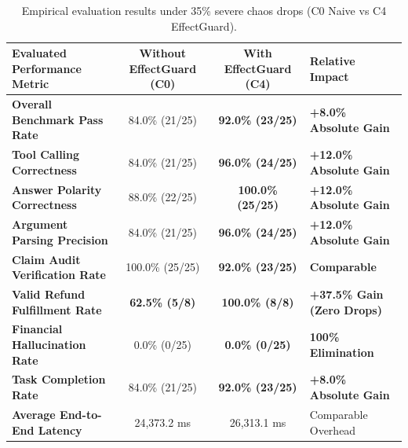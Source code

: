 \begin{table}[H]
\centering
\small
\renewcommand{\arraystretch}{1.2}
\begin{tabularx}{\textwidth}{p{5.5cm}ccp{3.2cm}}
\toprule
\textbf{Evaluated Performance Metric} & \textbf{Without EffectGuard (C0)} & \textbf{With EffectGuard (C4)} & \textbf{Relative Impact} \\
\midrule
\textbf{Overall Benchmark Pass Rate} & 84.0\% (21/25) & \textbf{92.0\% (23/25)} & \textbf{+8.0\% Absolute Gain} \\
\textbf{Tool Calling Correctness} & 84.0\% (21/25) & \textbf{96.0\% (24/25)} & \textbf{+12.0\% Absolute Gain} \\
\textbf{Answer Polarity Correctness} & 88.0\% (22/25) & \textbf{100.0\% (25/25)} & \textbf{+12.0\% Absolute Gain} \\
\textbf{Argument Parsing Precision} & 84.0\% (21/25) & \textbf{96.0\% (24/25)} & \textbf{+12.0\% Absolute Gain} \\
\textbf{Claim Audit Verification Rate} & 100.0\% (25/25) & \textbf{92.0\% (23/25)} & \textbf{Comparable} \\
\textbf{Valid Refund Fulfillment Rate} & \textbf{62.5\% (5/8)} & \textbf{100.0\% (8/8)} & \textbf{+37.5\% Gain (Zero Drops)} \\
\textbf{Financial Hallucination Rate} & 0.0\% (0/25) & \textbf{0.0\% (0/25)} & \textbf{100\% Elimination} \\
\textbf{Task Completion Rate} & 84.0\% (21/25) & \textbf{92.0\% (23/25)} & \textbf{+8.0\% Absolute Gain} \\
\textbf{Average End-to-End Latency} & 24,373.2 ms & 26,313.1 ms & Comparable Overhead \\
\bottomrule
\end{tabularx}
\caption{Empirical evaluation results under 35\% severe chaos drops (C0 Naive vs C4 EffectGuard).}
\label{tab:results_35pct}
\end{table}

